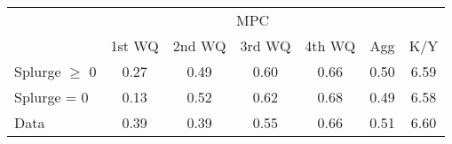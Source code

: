 \begin{tabular}{@{}lcccccc@{}} 
\toprule 
                  & \multicolumn{5}{c}{MPC} &   \\   
                  &  1st WQ  & 2nd WQ  & 3rd WQ & 4th WQ  & Agg  &  K/Y  \\  \midrule 
Splurge $\geq$ 0 &0.27 & 0.49 & 0.60 & 0.66 & 0.50 & 6.59 \\ 
Splurge = 0 &0.13 & 0.52 & 0.62 & 0.68 & 0.49 & 6.58 \\ 
Data &0.39 & 0.39 & 0.55 & 0.66 & 0.51 & 6.60 \\ \bottomrule
\end{tabular}  
